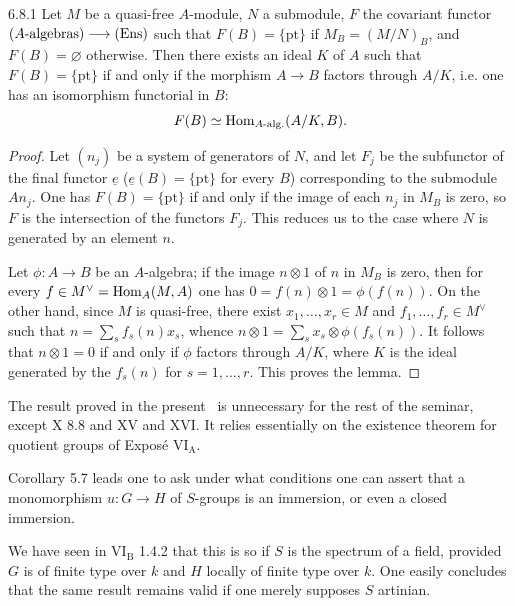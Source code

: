 \begin{lemma}{6.8.1}\label{VIII.6.8.1}
Let $M$ be a quasi-free $A$-module, $N$ a submodule, $F$ the covariant functor $(A\text{-algebras})\longrightarrow\textup{(Ens)}$ such that $F(B)=\{\mathrm{pt}\}$ if $M_B=(M/N)_B$, and $F(B)=\varnothing$ otherwise. Then there exists an ideal $K$ of $A$ such that $F(B)=\{\mathrm{pt}\}$ if and only if the morphism $A\to B$ factors through $A/K$, i.e. one has an isomorphism functorial in $B$:
\[
F(B)\simeq\operatorname{Hom}_{A\text{-}\mathrm{alg.}}(A/K,B).
\]
\end{lemma}
\begin{proof}
Let $(n_j)$ be a system of generators of $N$, and let $F_j$ be the subfunctor of the final functor $\underline e$ ($\underline e(B)=\{\mathrm{pt}\}$ for every $B$) corresponding to the submodule $An_j$. One has $F(B)=\{\mathrm{pt}\}$ if and only if the image of each $n_j$ in $M_B$ is zero, so $F$ is the intersection of the functors $F_j$. This reduces us to the case where $N$ is generated by an element $n$.

Let $\phi:A\to B$ be an $A$-algebra; if the image $n\otimes1$ of $n$ in $M_B$ is zero, then for every $f\in M^\vee=\operatorname{Hom}_A(M,A)$ one has $0=f(n)\otimes1=\phi(f(n))$. On the other hand, since $M$ is quasi-free, there exist $x_1,\dots,x_r\in M$ and $f_1,\dots,f_r\in M^\vee$ such that $n=\sum_s f_s(n)x_s$, whence $n\otimes1=\sum_s x_s\otimes\phi(f_s(n))$. It follows that $n\otimes1=0$ if and only if $\phi$ factors through $A/K$, where $K$ is the ideal generated by the $f_s(n)$ for $s=1,\dots,r$. This proves the lemma.
\end{proof}

The result proved in the present \No\ is unnecessary for the rest of the seminar, except X 8.8 and XV and XVI. It relies essentially on the existence theorem for quotient groups of Expos\'e VI$_{\mathrm A}$.

Corollary 5.7 leads one to ask under what conditions one can assert that a monomorphism $u:G\to H$ of $S$-groups is an immersion, or even a closed immersion.

We have seen in VI$_{\mathrm B}$ 1.4.2 that this is so if $S$ is the spectrum of a field, provided $G$ is of finite type over $k$ and $H$ locally of finite type over $k$. One easily concludes that the same result remains valid if one merely supposes $S$ artinian.


